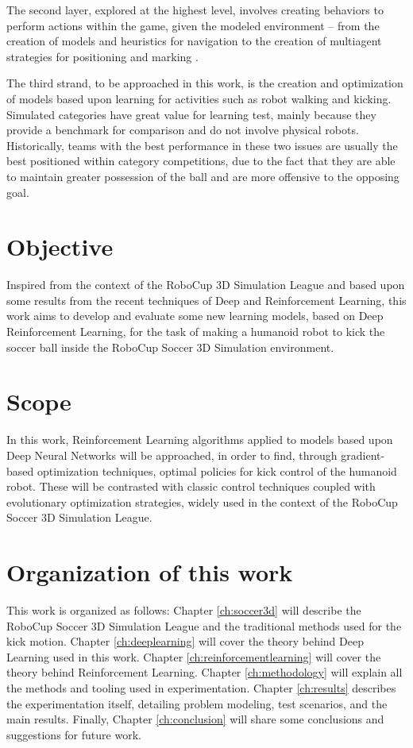 The second layer, explored at the highest level, involves creating behaviors to perform actions within the game, given the modeled environment -- from the creation of models and heuristics for navigation to the creation of multiagent strategies for positioning and marking \cite{LNAI16-MacAlpine}.

The third strand, to be approached in this work, is the creation and optimization of models based upon learning for activities such as robot walking and kicking. Simulated categories have great value for learning test, mainly because they provide a benchmark for comparison and do not involve physical robots. Historically, teams with the best performance in these two issues are usually the best positioned within category competitions, due to the fact that they are able to maintain greater possession of the ball and are more offensive to the opposing goal.

\section{Objective}

Inspired from the context of the RoboCup 3D Simulation League and based upon some results from the recent techniques of Deep and Reinforcement Learning, this work aims to develop and evaluate some new learning models, based on Deep Reinforcement Learning, for the task of making a humanoid robot to kick the soccer ball inside the RoboCup Soccer 	3D Simulation environment.

\section{Scope}

In this work, Reinforcement Learning algorithms applied to models based upon Deep Neural Networks will be approached, in order to find, through gradient-based optimization techniques, optimal policies for kick control of the humanoid robot. These will be contrasted with classic control techniques coupled with evolutionary optimization strategies, widely used in the context of the RoboCup Soccer 3D Simulation League.

\section{Organization of this work}

This work is organized as follows: Chapter \ref{ch:soccer3d} will describe the RoboCup Soccer 3D Simulation League and the traditional methods used for the kick motion. Chapter \ref{ch:deeplearning} will cover the theory behind Deep Learning used in this work. Chapter \ref {ch:reinforcementlearning} will cover the theory behind Reinforcement Learning. Chapter \ref{ch:methodology} will explain all the methods and tooling used in experimentation. Chapter \ref{ch:results} describes the experimentation itself, detailing problem modeling, test scenarios, and the main results. Finally, Chapter \ref{ch:conclusion} will share some conclusions and suggestions for future work.


